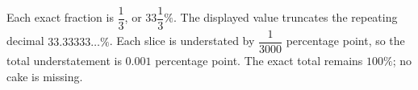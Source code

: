 Each exact fraction is $\dfrac{1}{3}$, or $33\dfrac{1}{3}\%$. The displayed value truncates the repeating decimal $33.33333\ldots\%$. Each slice is understated by $\dfrac{1}{3000}$ percentage point, so the total understatement is $0.001$ percentage point. The exact total remains $100\%$; no cake is missing.
